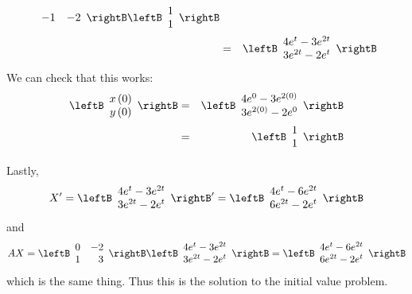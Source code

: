 \begin{solution}
\begin{eqnarray*}
\begin{array}{rr}
-1 & -2
\end{array}
\rightB \leftB 
\begin{array}{c}
1 \\ 
1
\end{array}
\rightB \\
&=&\leftB 
\begin{array}{c}
4e^{t}-3e^{2t} \\ 
3e^{2t}-2e^{t}
\end{array}
\rightB
\end{eqnarray*}
We can check that this works: 
\begin{eqnarray*}
\leftB 
\begin{array}{c}
x\left( 0\right) \\ 
y\left( 0\right)
\end{array}
\rightB &=&
\leftB 
\begin{array}{c}
4e^{0}-3e^{2(0)} \\ 
3e^{2(0)}-2e^{0}
\end{array}
\rightB \\
&=&
\leftB 
\begin{array}{c}
1 \\ 
1
\end{array}
\rightB
\end{eqnarray*}

Lastly, 
\begin{equation*}
X^{\prime} = 
\leftB 
\begin{array}{c}
4e^{t}-3e^{2t} \\ 
3e^{2t}-2e^{t}
\end{array}
\rightB ^{\prime }=\leftB 
\begin{array}{c}
4e^{t}-6e^{2t} \\ 
6e^{2t}-2e^{t}
\end{array}
\rightB
\end{equation*}
and 
\begin{equation*}
AX = \leftB  
\begin{array}{rr}
0 & -2 \\ 
1 & 3
\end{array}
\rightB \leftB 
\begin{array}{c}
4e^{t}-3e^{2t} \\ 
3e^{2t}-2e^{t}
\end{array}
\rightB =\leftB 
\begin{array}{c}
4e^{t}-6e^{2t} \\ 
6e^{2t}-2e^{t}
\end{array}
\rightB
\end{equation*}
which is the same thing. Thus this is the solution to the initial value
problem.
\end{solution}


